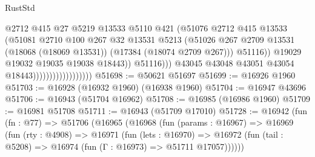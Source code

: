 \begin{lexlean}{RustStd}
\begin{coremodule}
                                                  @2712
                                                  @415
                                                  @27
                                                  @5219
                                                  @13533
                                                  @5110
                                                  @421
                                                  (@51076
                                                    @2712
                                                    @415
                                                    @13533
                                                    (@51081
                                                      @2710
                                                      @100
                                                      @267
                                                      @32
                                                      @13531
                                                      @5213
                                                      (@51026
                                                        @267
                                                        @2709
                                                        @13531
                                                        (@18068 (@18069 @13531))
                                                        (@17384 (@18074 @2709 @267)))
                                                      @51116))
                                                  @19029
                                                  @19032
                                                  @19035
                                                  @19038
                                                  @18443))
                                              @51116)))
                                        @43045
                                        @43048
                                        @43051
                                        @43054
                                        @18443))))))))))))))))))
@51698 := @50621 @51697
@51699 := @16926 @1960
@51703 := @16928 (@16932 @1960) (@16938 @1960)
@51704 := @16947 @43696
@51706 := @16943 (@51704 @16962)
@51708 := @16985 (@16986 @1960)
@51709 := @16981 @51708
@51711 := @16943 (@51709 @17010)
@51728 := @16942
    (fun (fn : @77) =>
    @51706
      (@16965
        (@16968
          (fun (params : @16967) =>
          @16969
            (fun (rty : @4908) =>
            @16971
              (fun (lets : @16970) =>
              @16972 (fun (tail : @5208) => @16974 (fun (Γ : @16973) => @51711 @17057))))))

\end{coremodule}
\end{lexlean}
